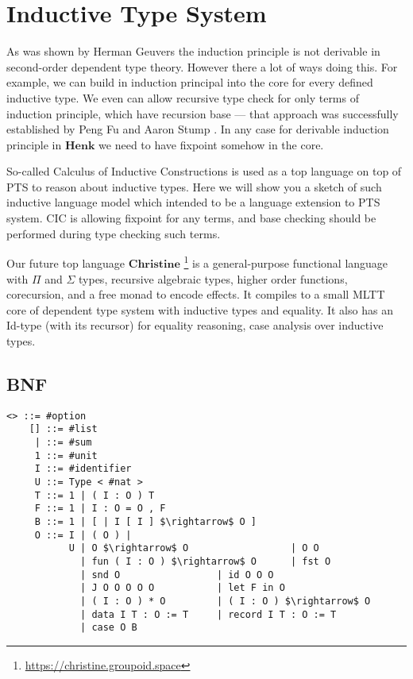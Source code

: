 \documentclass{article}
\begin{document}
\section{Inductive Type System}
As was shown by Herman Geuvers \cite{Geuvers01} the induction principle is not derivable in second-order dependent type theory.
However there a lot of ways doing this. For example, we can build in induction principal into the core for every defined inductive type.
We even can allow recursive type check for only terms of induction principle, which have recursion base --- that approach was successfully established by Peng Fu and Aaron Stump \cite{Stump17}.
In any case for derivable induction principle in $\mathbf{Henk}$ we need to have fixpoint somehow in the core.

So-called Calculus of Inductive Constructions \cite{Mohring15} is used as a top language on top of PTS to reason about inductive types.
Here we will show you a sketch of such inductive language model which intended to be a language extension to PTS system.
CIC is allowing fixpoint for any terms, and base checking should be performed during type checking such terms.

Our future top language $\mathbf{Christine}$ \footnote{\url{https://christine.groupoid.space}} is a general-purpose functional language with $\Pi$ and $\Sigma$ types, recursive algebraic types, higher order functions, corecursion, and a free monad to encode effects.
It compiles to a small MLTT core of dependent type system with inductive types and equality.
It also has an Id-type (with its recursor) for equality reasoning, case analysis over inductive types.

\subsection{BNF}

\begin{lstlisting}[mathescape=true]
    <> ::= #option
    [] ::= #list
     | ::= #sum
     1 ::= #unit
     I ::= #identifier
     U ::= Type < #nat >
     T ::= 1 | ( I : O ) T
     F ::= 1 | I : O = O , F
     B ::= 1 | [ | I [ I ] $\rightarrow$ O ]
     O ::= I | ( O ) |
           U | O $\rightarrow$ O                  | O O
             | fun ( I : O ) $\rightarrow$ O      | fst O
             | snd O                 | id O O O
             | J O O O O O           | let F in O
             | ( I : O ) * O         | ( I : O ) $\rightarrow$ O
             | data I T : O := T     | record I T : O := T
             | case O B
\end{lstlisting}
\end{document}
